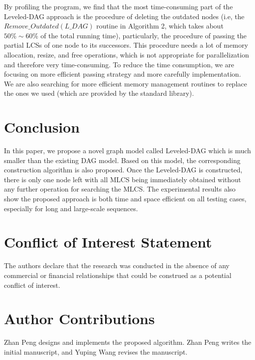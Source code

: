 \documentclass[utf8]{frontiersSCNS} %
\begin{document}
By profiling the program, we find that the most time-consuming part of
the Leveled-DAG approach is the procedure of deleting the outdated
nodes (i.e, the $Remove\_Outdated(L\_DAG)$ routine in Algorithm 2,
which takes about $50\% \sim 60\%$ of the total running time),
particularly, the procedure of passing the partial LCSs of one node to
its successors. This procedure needs a lot of memory allocation,
resize, and free operations, which is not appropriate for
parallelization and therefore very time-consuming. To reduce the time
consumption, we are focusing on more efficient passing strategy and
more carefully implementation. We are also searching for more
efficient memory management routines to replace the ones we used
(which are provided by the standard library).


\section{Conclusion}
\label{sec:conclusion}

In this paper, we propose a novel graph model called Leveled-DAG which
is much smaller than the existing DAG model. Based on this model, the
corresponding construction algorithm is also proposed. Once the
Leveled-DAG is constructed, there is only one node left with all MLCS
being immediately obtained without any further operation for searching
the MLCS. The experimental results also show the proposed approach is
both time and space efficient on all testing cases, especially for
long and large-scale sequences.

\section*{Conflict of Interest Statement}

The authors declare that the research was conducted in the absence of
any commercial or financial relationships that could be construed as a
potential conflict of interest.

\section*{Author Contributions}

Zhan Peng designs and implements the proposed algorithm. Zhan Peng
writes the initial manuscript, and Yuping Wang revises the manuscript.
\end{document}
